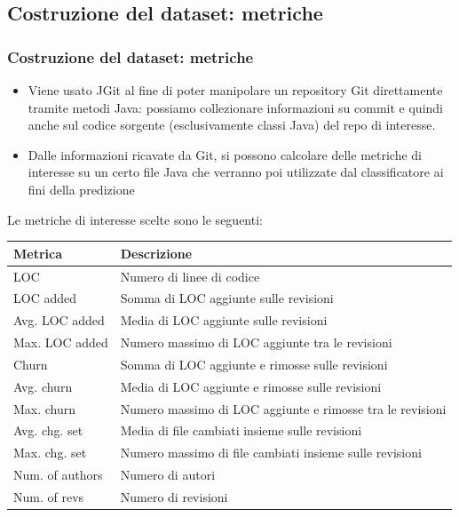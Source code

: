 \documentclass{beamer}
\newcommand{\dflvspace}{\vspace{10pt}}
\begin{document}
\subsection{Costruzione del dataset: metriche}
\begin{frame}
	\frametitle{Costruzione del dataset: metriche}
	
	\fontsize{9pt}{10pt}\selectfont
	
	\begin{itemize}
	
		\item Viene usato JGit al fine di poter manipolare un 
		repository Git direttamente tramite metodi Java: possiamo
		collezionare informazioni su commit e quindi anche sul codice sorgente 
		(esclusivamente classi Java) del repo di interesse.
		
		\item Dalle informazioni ricavate da Git, si possono calcolare delle metriche di interesse
		su un certo file Java che verranno poi utilizzate dal classificatore ai
		fini della predizione
	\end{itemize}
	
	\dflvspace
	
	Le metriche di interesse scelte sono le seguenti:
	
	\dflvspace
	
	\centering
	\begin{tabular}{|l|l|}
		\hline
		\textbf{Metrica} & \textbf{Descrizione} \\
		\hline
		\hline 
		LOC & Numero di linee di codice\\
		\hline
		LOC added & Somma di LOC aggiunte sulle revisioni\\
		\hline
		Avg. LOC added & Media di LOC aggiunte sulle revisioni\\
		\hline
		Max. LOC added & Numero massimo di LOC aggiunte tra le revisioni\\
		\hline
		Churn & Somma di LOC aggiunte e rimosse sulle revisioni\\
		\hline
		Avg. churn & Media di LOC aggiunte e rimosse sulle revisioni\\
		\hline
		Max. churn & Numero massimo di LOC aggiunte e rimosse tra le revisioni\\
		\hline
		Avg. chg. set & Media di file cambiati insieme sulle revisioni\\
		\hline
		Max. chg. set & Numero massimo di file cambiati insieme sulle revisioni\\
		\hline
		Num. of authors & Numero di autori\\
		\hline
		Num. of revs & Numero di revisioni\\
		\hline
	\end{tabular}
	
	
\end{frame}
\end{document}
